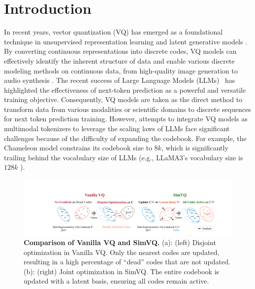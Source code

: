 \section{Introduction}

In recent years, vector quantization (VQ) \cite{NIPS2017_7a98af17,NEURIPS2019_5f8e2fa1} has emerged as a foundational technique in unsupervised representation learning \cite{NEURIPS2020_92d1e1eb,pmlr-v235-bruce24a} and latent generative models \cite{Rombach_2022_CVPR,yu2022vectorquantized,yu2022scaling,10158503,wang2023neural,zhu-etal-2024-generative}. By converting continuous representations into discrete codes, VQ models can effectively identify the inherent structure of data and enable various discrete modeling methods on continuous data, from high-quality image generation \cite{Esser_2021_CVPR} to audio synthesis \cite{efossez2023high}. The recent success of Large Language Models (LLMs)~\cite{achiam2023gpt} has highlighted the effectiveness of next-token prediction as a powerful and versatile training objective. Consequently, VQ models are taken as the direct method to transform data from various modalities \cite{zhang-etal-2023-speechgpt,sun2024autoregressive,team2024chameleon} or scientific domains \cite{gao2024foldtoken} to discrete sequences for next token prediction training. However, attempts to integrate VQ models as multimodal tokenizers to leverage the scaling laws of LLMs face significant challenges because of the difficulty of expanding the codebook. For example, the Chameleon model \cite{team2024chameleon} constrains its codebook size to $8k$, which is significantly trailing behind the vocabulary size of LLMs (e.g., LLaMA3's vocabulary size is $128k$ \cite{dubey2024llama}).

\begin{figure}[t]
    \centering
    \includegraphics[width=2.0\columnwidth]{material/intro1_2_big.pdf}
    \caption{\textbf{Comparison of Vanilla VQ and SimVQ.} (a): (left) Disjoint optimization in Vanilla VQ. Only the nearest codes are updated, resulting in a high percentage of ``dead'' codes that are not updated. (b): (right) Joint optimization in SimVQ. The entire codebook is updated with a latent basis, ensuring all codes remain active.}
    \label{fig:intro}
\end{figure}




